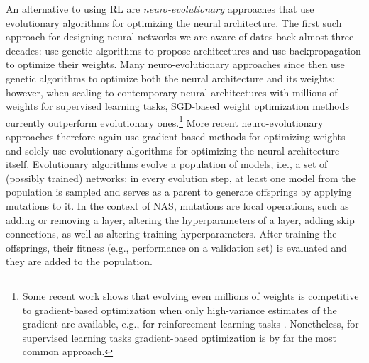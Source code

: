 \documentclass[twoside,11pt]{article}
\begin{document}
An alternative to using RL are \emph{neuro-evolutionary} approaches that use evolutionary algorithms for optimizing the neural architecture. 
The first such approach for designing neural networks we are aware of dates back almost three decades: \citet{miller_designing_89} use genetic algorithms to propose architectures and use backpropagation to optimize their weights. 
Many neuro-evolutionary approaches since then \citep{Angeline1994AnEA,stanley_evolving_2002,Stanley:2009:HEE:1516090.1516093} use genetic algorithms to optimize both the neural architecture and its weights; however, when scaling to contemporary neural architectures with millions of weights for supervised learning tasks, SGD-based weight optimization methods currently outperform evolutionary ones.\footnote{Some recent work shows that evolving even millions of weights is competitive to gradient-based optimization when only high-variance estimates of the gradient are available, e.g., for reinforcement learning tasks \citep{Salimans2017_alternative,Such2017DeepNG,chrabaszcz-ijcai18a}. Nonetheless, for supervised learning tasks gradient-based optimization is by far the most common approach.} More recent neuro-evolutionary approaches \citep{DBLP:journals/corr/RealMSSSLK17, DBLP:journals/corr/SuganumaSN17,liu_hierarchical_2017,real_regularized_2018,miikkulainen_evolving_2017,xie_genetic_2017,elsken_multi_2018} therefore again use gradient-based methods for optimizing weights and solely use evolutionary algorithms for optimizing the neural architecture itself. 
Evolutionary algorithms evolve a population of models, i.e., a set of (possibly trained) networks; in every evolution step, at least one model from the population is sampled and serves as a parent to generate offsprings by applying mutations to it. In the context of NAS, mutations are local operations, such as adding or removing a layer, altering the hyperparameters of a layer, adding skip connections, as well as altering training hyperparameters. After training the offsprings, their fitness (e.g., performance on a validation set) is evaluated and they are added to the population.
\end{document}
